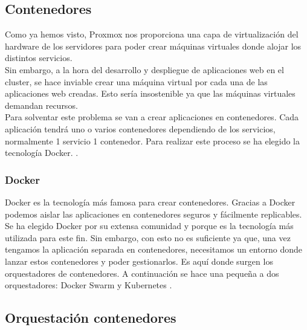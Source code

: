         \subsection{Contenedores}
                \begin{text}
                        Como ya hemos visto, Proxmox nos proporciona una capa de virtualización del hardware de los servidores para poder crear máquinas virtuales donde alojar los distintos servicios. \\
                        Sin embargo, a la hora del desarrollo y despliegue de aplicaciones web en el cluster, se hace inviable crear una máquina virtual por cada una de las aplicaciones web creadas. Esto sería insostenible ya que las máquinas virtuales demandan recursos. \\

                        Para solventar este problema se van a crear aplicaciones en contenedores. Cada aplicación tendrá uno o varios contenedores dependiendo de los servicios, normalmente 1 servicio 1 contenedor. Para realizar este proceso se ha elegido la tecnología Docker. \cite{docker:online}.
                \end{text}
                \subsubsection{Docker}
                \begin{text}
                        Docker es la tecnología más famosa para crear contenedores. Gracias a Docker podemos aislar las aplicaciones en contenedores seguros y fácilmente replicables. Se ha elegido Docker por su extensa comunidad y porque es la tecnología más utilizada para este fin. Sin embargo, con esto no es suficiente ya que, una vez tengamos la aplicación separada en contenedores, necesitamos un entorno donde lanzar estos contenedores y poder gestionarlos. Es aquí donde surgen los orquestadores de contenedores. A continuación se hace una pequeña a dos orquestadores: Docker Swarm \cite{swarm:online} y Kubernetes \cite{k8:online}.
                \end{text}
        \subsection{Orquestación contenedores}
